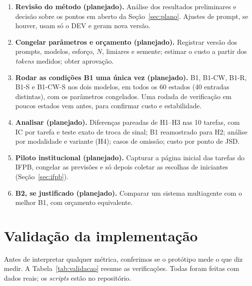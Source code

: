 \documentclass[12pt]{article}
\begin{document}
\begin{enumerate}[leftmargin=*,label=\textbf{Passo \arabic*.},itemsep=3pt]
\item \textbf{Revisão do método (planejado).} Análise dos resultados preliminares e decisão sobre os pontos em aberto da Seção~\ref{sec:plano}. Ajustes de prompt, se houver, usam só o DEV e geram nova versão.
\item \textbf{Congelar parâmetros e orçamento (planejado).} Registrar versão dos prompts, modelos, esforço, $N$, limiares e semente; estimar o custo a partir dos \textit{tokens} medidos; obter aprovação.
\item \textbf{Rodar as condições B1 uma única vez (planejado).} B1, B1-CW, B1-R, B1-S e B1-CW-S nos dois modelos, em todos os 60 estados (40 entradas distintas), com os parâmetros congelados. Uma rodada de verificação em poucos estados vem antes, para confirmar custo e estabilidade.
\item \textbf{Analisar (planejado).} Diferenças pareadas de H1--H3 nas 10 tarefas, com IC por tarefa e teste exato de troca de sinal; B1 reamostrado para H2; análise por modalidade e variante (H4); casos de omissão; custo por ponto de JSD.
\item \textbf{Piloto institucional (planejado).} Capturar a página inicial das tarefas do IFPB, congelar as previsões e só depois coletar as escolhas de iniciantes (Seção~\ref{sec:ifpb}).
\item \textbf{B2, se justificado (planejado).} Comparar um sistema multiagente com o melhor B1, com orçamento equivalente.
\end{enumerate}

\section{Validação da implementação}
\label{sec:validacao}

\begin{real}
Antes de interpretar qualquer métrica, conferimos se o protótipo mede o que diz medir. A Tabela~\ref{tab:validacao} resume as verificações. Todas foram feitas com dados reais; os \textit{scripts} estão no repositório.
\end{real}
\end{document}

